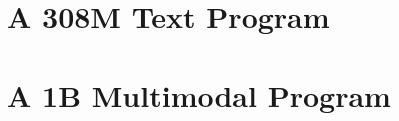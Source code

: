 \documentclass[10pt]{article}
\begin{document}
\part{A 308M Text Program}













\part{A 1B Multimodal Program}






\appendix

\end{document}
